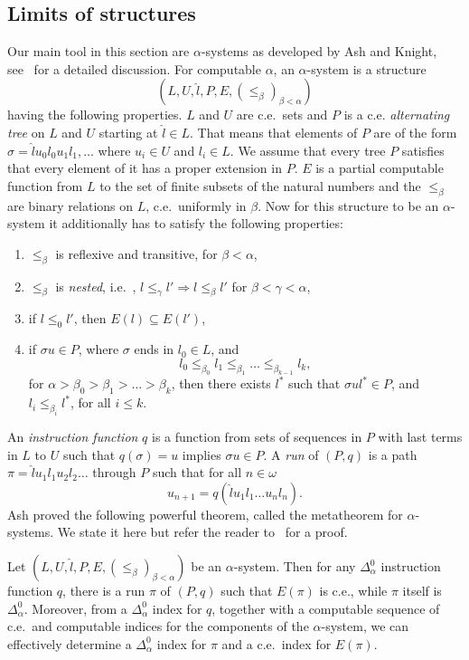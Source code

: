 \documentclass{amsart}
\newcommand\+[1]{\mathcal{#1}}
\renewcommand\*[1]{\mathbf{#1}}
\renewcommand\=[1]{\text{#1}}
\renewcommand\*[1]{\mathbf{#1}}
\newcommand{\Ra}{\Rightarrow}
\begin{document}
  \subsection{Limits of structures}\label{subsec:limits}
Our main tool in this section are $\alpha$-systems as developed by Ash and Knight, see~\cite{ash2000} for a detailed discussion. For computable $\alpha$, an $\alpha$-system is a structure
\[ (L,U,\hat l, P,E, (\leq_\beta)_{\beta<\alpha})\]
having the following properties. $L$ and $U$ are c.e.\ sets and $P$ is a c.e. \emph{alternating tree} on $L$ and $U$ starting at $\hat l\in L$. That means that elements of $P$ are of the form $\sigma=\hat lu_0l_0u_1l_1,\dots$ where $u_i\in U$ and $l_i\in L$. We assume that every tree $P$ satisfies that every element of it has a proper extension in $P$. $E$ is a partial computable function from $L$ to the set of finite subsets of the natural numbers and the $\leq_\beta$ are binary relations on $L$, c.e.\ uniformly in $\beta$. Now for this structure to be an $\alpha$-system it additionally has to satisfy the following properties:
\begin{enumerate}
    \item\label{it:asys1}$\leq_\beta$ is reflexive and transitive, for $\beta<\alpha$,
    \item\label{it:asys2}$\leq_\beta$ is \emph{nested}, i.e.\ , $l\leq_\gamma l'\Ra l\leq_\beta l'$ for $\beta<\gamma<\alpha$,
    \item\label{it:asys3} if $l\leq_0 l'$, then $E(l) \subseteq E(l')$,
    \item\label{it:asys4} if $\sigma u\in P$, where $\sigma$ ends in $l_0\in L$, and
    \[ l_0\leq_{\beta_0} l_1\leq_{\beta_1}\dots\leq_{\beta_{k-1}} l_k,\]
    for $\alpha>\beta_0>\beta_1>\dots >\beta_k$, then there exists $l^*$ such that $\sigma ul^*\in P$, and $l_i\leq_{\beta_i} l^*$, for all $i\leq k$.
\end{enumerate}
An \emph{instruction function} $q$ is a function from sets of sequences in $P$ with last terms in $L$ to $U$ such that $q(\sigma)=u$ implies $\sigma u\in P$. A \emph{run} of $(P,q)$ is a path $\pi=\hat l u_1l_1u_2l_2\dots$ through $P$ such that for all $n\in \omega$
\[ u_{n+1}=q(\hat lu_1l_1\dots u_nl_n).\]
Ash proved the following powerful theorem, called the metatheorem for $\alpha$-systems. We state it here but refer the reader to~\cite{ash2000} for a proof.
\begin{theorem}
Let $(L,U,\hat l, P,E, (\leq_\beta)_{\beta<\alpha})$ be an $\alpha$-system. Then for any $\Delta_\alpha^0$ instruction function $q$, there is a run $\pi$ of $(P,q)$ such that $E(\pi)$ is c.e., while $\pi$ itself is $\Delta_\alpha^0$. Moreover, from a $\Delta_\alpha^0$ index for $q$, together with a computable sequence of c.e.\ and computable indices for the components of the $\alpha$-system, we can effectively determine a $\Delta_\alpha^0$ index for $\pi$ and a c.e.\ index for $E(\pi)$.
\end{theorem}
\end{document}

